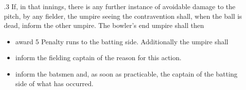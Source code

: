 \documentclass[12pt]{article}
\begin{document}
\vspace{\baselineskip}

\vspace{\baselineskip}

\vspace{\baselineskip}

\vspace{\baselineskip}

\vspace{\baselineskip}

\vspace{\baselineskip}

\vspace{\baselineskip}
\begin{Center}
{\fontsize{8pt}{9.6pt}\par}
\end{Center}\par


\vspace{\baselineskip}

\vspace{\baselineskip}
\begin{adjustwidth}{0.5in}{0.01in}
{\fontsize{9pt}{10.8pt}.3 If, in that innings, there is any further instance of avoidable damage to the pitch, by any fielder, the umpire seeing the contravention shall, when the ball is dead, inform the other umpire. The bowler’s end umpire shall then\par}\par

\end{adjustwidth}


\vspace{\baselineskip}
\begin{itemize}
	\item {\fontsize{9pt}{10.8pt}\selectfont award 5 Penalty runs to the batting side. Additionally the umpire shall\par}\par


\vspace{\baselineskip}
	\item {\fontsize{9pt}{10.8pt}\selectfont inform the fielding captain of the reason for this action.\par}\par


\vspace{\baselineskip}
	\item {\fontsize{9pt}{10.8pt}\selectfont inform the batsmen and, as soon as practicable, the captain of the batting side of what has occurred.\par}
\end{itemize}\par
\end{document}

